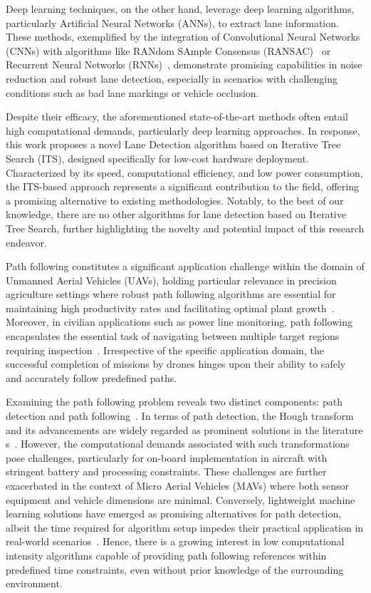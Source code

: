 Deep learning techniques, on the other hand, leverage deep learning algorithms, particularly Artificial Neural Networks (ANNs), to extract lane information. These methods, exemplified by the integration of Convolutional Neural Networks (CNNs) with algorithms like RANdom SAmple Consensus (RANSAC)~\cite{kim2014robust} or Recurrent Neural Networks (RNNs)~\cite{zou2019robust}, demonstrate promising capabilities in noise reduction and robust lane detection, especially in scenarios with challenging conditions such as bad lane markings or vehicle occlusion.

Despite their efficacy, the aforementioned state-of-the-art methods often entail high computational demands, particularly deep learning approaches. In response, this work proposes a novel Lane Detection algorithm based on Iterative Tree Search (ITS), designed specifically for low-cost hardware deployment. Characterized by its speed, computational efficiency, and low power consumption, the ITS-based approach represents a significant contribution to the field, offering a promising alternative to existing methodologies. Notably, to the best of our knowledge, there are no other algorithms for lane detection based on Iterative Tree Search, further highlighting the novelty and potential impact of this research endeavor.


Path following constitutes a significant application challenge within the domain of Unmanned Aerial Vehicles (UAVs), holding particular relevance in precision agriculture settings where robust path following algorithms are essential for maintaining high productivity rates and facilitating optimal plant growth~\cite{1_basso2019uav}. Moreover, in civilian applications such as power line monitoring, path following encapsulates the essential task of navigating between multiple target regions requiring inspection~\cite{Silano2021ICRARAL}. Irrespective of the specific application domain, the successful completion of missions by drones hinges upon their ability to safely and accurately follow predefined paths.

Examining the path following problem reveals two distinct components: path detection and path following~\cite{Dahroug2018MARSS, Rafique2020TAES}. In terms of path detection, the Hough transform and its advancements are widely regarded as prominent solutions in the literature s~\cite{6_duan2010improved, Du2010TIMP,5_duda1972use}. However, the computational demands associated with such transformations pose challenges, particularly for on-board implementation in aircraft with stringent battery and processing constraints. These challenges are further exacerbated in the context of Micro Aerial Vehicles (MAVs) where both sensor equipment and vehicle dimensions are minimal. Conversely, lightweight machine learning solutions have emerged as promising alternatives for path detection, albeit the time required for algorithm setup impedes their practical application in real-world scenarios~\cite{7_van2019ls, Tang2021PR}. Hence, there is a growing interest in low computational intensity algorithms capable of providing path following references within predefined time constraints, even without prior knowledge of the surrounding environment.

